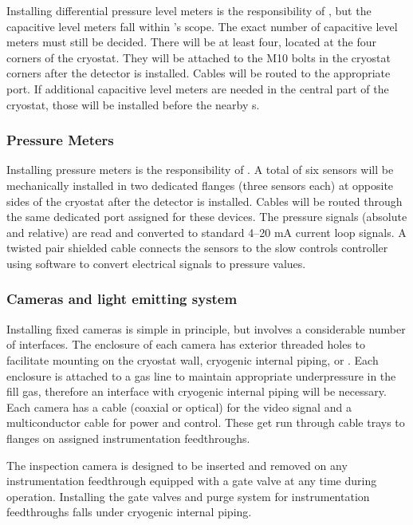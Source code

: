 Installing differential pressure level meters is the responsibility of , but the capacitive level meters fall within 's scope. The exact number of capacitive level meters must still be decided. There will be at least four, located at the four corners of the cryostat. 
They will be attached to the M10 bolts in the cryostat corners after the detector is installed. Cables will be routed to the appropriate  port. If additional capacitive level meters are needed in the central part of the cryostat, those will be installed before the nearby s. 

\subsubsection{Pressure Meters}
\label{sec:fdgen-slow-cryo-install-press}
Installing pressure meters is the responsibility of . A total of six sensors will be mechanically installed in two dedicated flanges (three sensors each) at opposite sides of the cryostat after the detector is installed. Cables will be routed through the same dedicated port assigned for these devices. The pressure signals (absolute and relative) are read and converted to
standard 4--20 mA current loop signals.
A twisted pair shielded cable connects the sensors to the slow controls  controller using software to convert electrical signals to pressure values.

\subsubsection{Cameras and light emitting system}
\label{sec:fdgen-slow-cryo-install-c}

Installing fixed cameras is simple in principle, but involves a
considerable number of interfaces. The enclosure of each camera has
exterior threaded holes to facilitate mounting on the cryostat wall,
cryogenic internal piping, or . Each
enclosure %
is attached to a gas line to maintain appropriate
underpressure in the fill gas, %
therefore an interface with cryogenic
internal piping will be necessary. Each camera has a cable (coaxial or
optical) for the video signal and a multiconductor cable for power and
control. These %
get run through cable trays to flanges on assigned
instrumentation feedthroughs.

The inspection camera is designed to be inserted and removed on any
instrumentation feedthrough equipped with a gate valve at any time
during operation.  Installing the gate valves and purge system
for instrumentation feedthroughs falls under cryogenic internal
piping.


